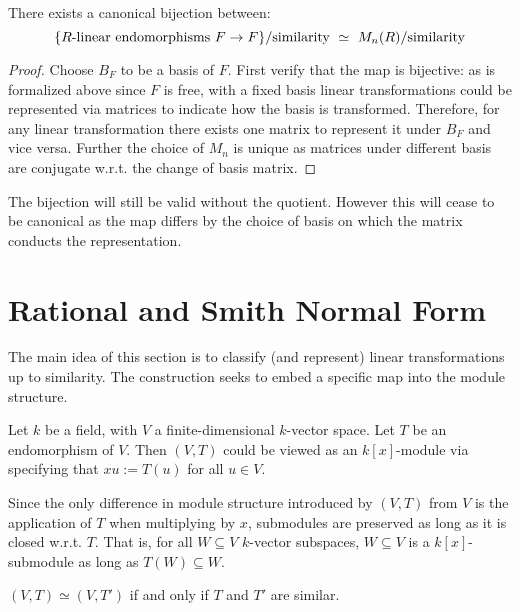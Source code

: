 \documentclass{article}
\begin{document}
\begin{proposition}\label{prop:canonical bijection}
    There exists a canonical bijection between:
    \[
        \{ R\text{\upshape{-linear endomorphisms}}\ F\to F \} / \text{\upshape{similarity}}\ \simeq\ M_n(R) / \text{\upshape{similarity}}
    \]
\end{proposition}

\begin{proof}
    Choose $B_F$ to be a basis of $F$. First verify that the map is bijective: as is formalized above since $F$ is free, with a fixed basis linear transformations could be represented via matrices to indicate how the basis is transformed. Therefore, for any linear transformation there exists one matrix to represent it under $B_F$ and vice versa. Further the choice of $M_n$ is unique as matrices under different basis are conjugate w.r.t. the change of basis matrix.
\end{proof}

\begin{remark}
    The bijection will still be valid without the quotient. However this will cease to be canonical as the map differs by the choice of basis on which the matrix conducts the representation.
\end{remark}

\section{Rational and Smith Normal Form}

The main idea of this section is to classify (and represent) linear transformations up to similarity. The construction seeks to embed a specific map into the module structure.

Let $k$ be a field, with $V$ a finite-dimensional $k$-vector space. Let $T$ be an endomorphism of $V$. Then $(V, T)$ could be viewed as an $k[x]$-module via specifying that $xu := T(u)$ for all $u\in V$. 

\begin{remark}
    Since the only difference in module structure introduced by $(V, T)$ from $V$ is the application of $T$ when multiplying by $x$, submodules are preserved as long as it is closed w.r.t. $T$. That is, for all $W \subseteq V$ $k$-vector subspaces, $W\subseteq V$ is a $k[x]$-submodule as long as $T(W) \subseteq W$.  
\end{remark}

\begin{proposition}\label{prop:(V, T) isom}
    $(V, T) \simeq (V, T')$ if and only if $T$ and $T'$ are similar.
\end{proposition}
\end{document}
